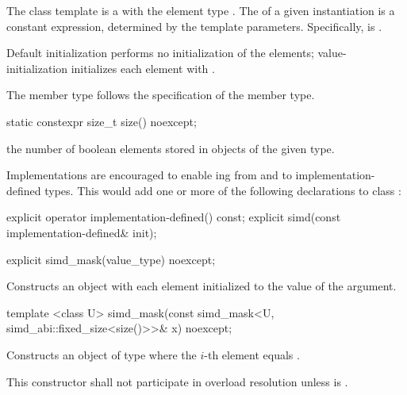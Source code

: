 

\pnum The class template \mask is a \dataparalleltype with the element type \bool.
The \width of a given \mask instantiation is a constant expression, determined by the template parameters.
Specifically,  is \true.


\pnum Default initialization performs no initialization of the elements; value-initialization initializes each element with .

\pnum The member type  follows the specification of the  member type.

\begin{itemdecl}
static constexpr size_t size() noexcept;
\end{itemdecl}
\begin{itemdescr}
  \pnum\returns the number of boolean elements stored in objects of the given \mask[<T, Abi>] type.
\end{itemdescr}

\pnum\begin{noteEnv}Implementations are encouraged to enable ing from and to implementation-defined types.
This would add one or more of the following declarations to class \mask:
\begin{itemdecl}
explicit operator implementation-defined() const;
explicit simd(const implementation-defined& init);
\end{itemdecl}
\end{noteEnv}

\begin{itemdecl}
explicit simd_mask(value_type) noexcept;
\end{itemdecl}
\begin{itemdescr}
  \pnum\effects Constructs an object with each element initialized to the value of the argument.
\end{itemdescr}

\begin{itemdecl}
template <class U> simd_mask(const simd_mask<U, simd_abi::fixed_size<size()>>& x) noexcept;
\end{itemdecl}
\begin{itemdescr}
  \pnum\effects Constructs an object of type \mask where the $i$-th element equals  \foralli.

  \pnum\remarks This constructor shall not participate in overload resolution unless  is \fixedsizescoped{}.
\end{itemdescr}

